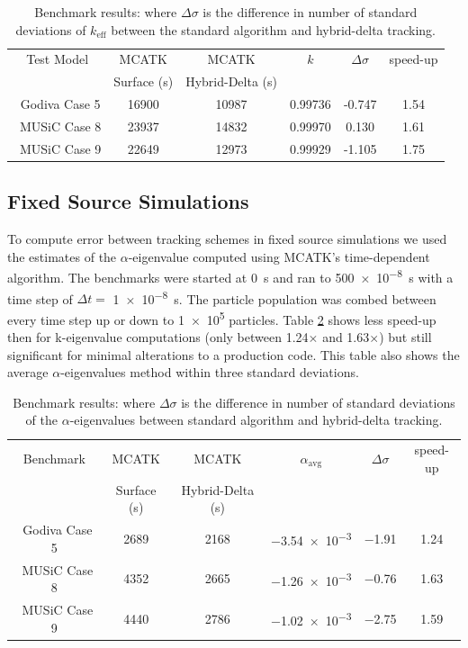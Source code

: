 \begin{table}[!htb]
  \centering
  \caption{Benchmark results: where ${\Delta \sigma}$ is the difference in number of standard deviations of ${k_{\text{eff}}}$ between the standard algorithm and hybrid-delta tracking.}
  \label{table:mcatkruntime} 
  \begin{tabular}{c c c c c c  } \hline 
    Test Model & MCATK & MCATK & $k$ & $\Delta \sigma$ & speed-up\\
               & Surface (s)  & Hybrid-Delta (s) &  & &\\ \hline
    \ Godiva Case 5 & 16900 &  10987 & 0.99736 &  -0.747 & 1.54 \\
    \ MUSiC Case 8  & 23937 &  14832 & 0.99970 &  0.130 & 1.61 \\
    \ MUSiC Case 9  & 22649 &  12973 & 0.99929 &  -1.105 & 1.75 \\ 
    \hline
  \end{tabular}
\end{table}

\subsection{Fixed Source Simulations}

To compute error between tracking schemes in fixed source simulations we used the estimates of the $\alpha$-eigenvalue computed using MCATK's time-dependent algorithm.
The benchmarks were started at \SI{0}{\second} and ran to \SI{500e-8}{\second} with a time step of $\Delta t =$ \SI{1e-8}{\second}.
The particle population was combed between every time step up or down to \num{1e5} particles. 
Table \ref{table:runtime_trans} shows less speed-up then for k-eigenvalue computations (only between 1.24$\times$ and 1.63$\times$) but still significant for minimal alterations to a production code. This table also shows the average $\alpha$-eigenvalues method within three standard deviations.

\begin{table}[!htb]
  \centering
  \caption{ Benchmark results: where ${\Delta \sigma}$ is the difference in number of standard deviations of the $\alpha$-eigenvalues between standard algorithm and hybrid-delta tracking.}
  \label{table:runtime_trans} 
  \begin{tabular}{c c c c c c } \hline 
    Benchmark & MCATK            & MCATK         & $\alpha_{\text{avg}}$ & $\Delta \sigma$ & speed-up\\
               & Surface (s)  & Hybrid-Delta (s) & &                 &\\ \hline
    \ Godiva Case 5 & 2689 &  2168 & \num{-3.54e-3} &  \num{-1.91} & 1.24 \\
    \ MUSiC Case 8  & 4352 &  2665 & \num{-1.26e-3} &  \num{-0.76} & 1.63 \\
    \ MUSiC Case 9  & 4440 &  2786 & \num{-1.02e-3} &  \num{-2.75} & 1.59 \\ 
    \hline
  \end{tabular}
\end{table}

